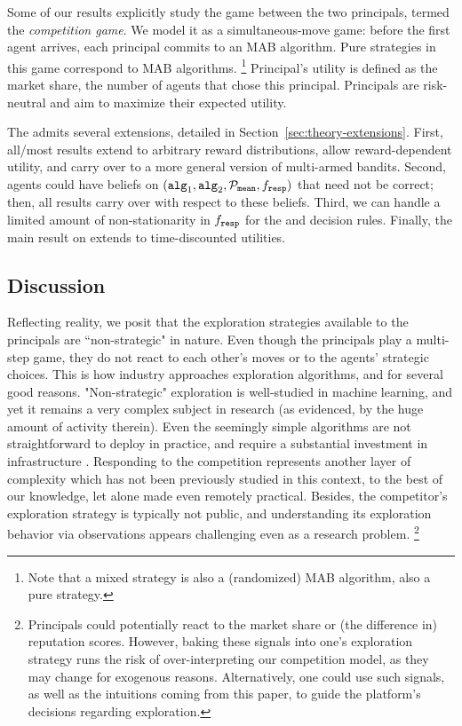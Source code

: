 Some of our results explicitly study the game between the two principals, termed the \emph{competition game}. We model it as a simultaneous-move game: before the first agent arrives, each principal commits to an MAB algorithm.
Pure strategies in this game correspond to MAB algorithms.%
\footnote{Note that a mixed strategy is also a (randomized) MAB algorithm, \ie also a pure strategy.}
 Principal's utility is defined as the market share, \ie the number of agents that chose this principal. Principals are risk-neutral and aim to maximize their expected utility.


 The \TheoryModel admits several extensions, detailed in Section~\ref{sec:theory-extensions}. First, all/most results extend to arbitrary reward distributions, allow reward-dependent utility, and carry over to a more general version of multi-armed bandits. Second, agents could have beliefs on $(\alg[1],\alg[2],\priorMu,\respF)$ that need not be correct; then, all results carry over with respect to these beliefs.
Third, we can handle a limited amount of non-stationarity in $\respF$ for the \HardMaxRandom and \SoftMaxRandom decision rules. Finally, the main result on \HardMax extends to time-discounted utilities.


\subsection{Discussion}
\label{sec:discussion}

Reflecting reality, we posit that the exploration strategies available to the principals are ``non-strategic" in nature. Even though the principals play a multi-step game, they do not react to each other's moves or to the agents' strategic choices. This is how industry approaches exploration algorithms, and for several good reasons. "Non-strategic" exploration is well-studied in machine learning, and yet it remains a very complex subject in research (as evidenced, \eg by the huge amount of activity therein). Even the seemingly simple algorithms are not straightforward to deploy in practice, and require a substantial investment in infrastructure \cite[\eg see the discussions in][]{DS-arxiv}. Responding to the competition represents another layer of complexity which has not been previously studied in this context, to the best of our knowledge, let alone made even remotely practical. Besides, the competitor's exploration strategy is typically not public, and understanding its exploration behavior via observations appears challenging even as a  research problem.%
\footnote{Principals could potentially react to the market share or (the difference in) reputation scores. However, baking these signals into one's exploration strategy runs the risk of over-interpreting our competition model, as they may change for exogenous reasons. Alternatively, one could use such signals, as well as the intuitions coming from this paper, to guide the platform's decisions regarding exploration.}


